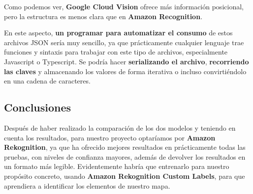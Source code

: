 Como podemos ver, \textbf{Google Cloud Vision} ofrece más información posicional, pero la estructura es menos clara que en \textbf{Amazon Recognition}.

En este aspecto, \textbf{un programar para automatizar el consumo} de estos archivos JSON sería muy sencillo, ya que prácticamente cualquier lenguaje trae funciones y sintaxis para trabajar con este tipo de archivos, especialmente Javascript o Typescript. Se podría hacer \textbf{serializando el archivo}, \textbf{recorriendo las claves} y almacenando los valores de forma iterativa o incluso convirtiéndolo en una cadena de caracteres.

\subsection{Conclusiones}
Después de haber realizado la comparación de los dos modelos y teniendo en cuenta los resultados, para nuestro proyecto optaríamos por \textbf{Amazon Rekognition}, ya que ha ofrecido mejores resultados en prácticamente todas las pruebas, con niveles de confianza mayores, además de devolver los resultados en un formato más legible. Evidentemente habría que entrenarlo para nuestro propósito concreto, usando \textbf{Amazon Rekognition Custom Labels}, para que aprendiera a identificar los elementos de nuestro mapa. 



\newpage





  